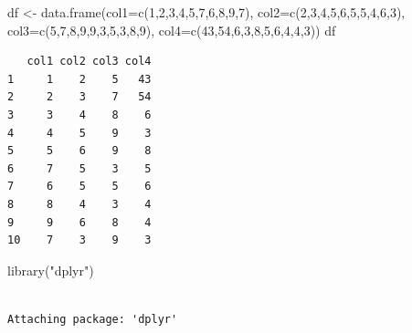 \documentclass[
  letterpaper,
  DIV=11,
  numbers=noendperiod]{scrreprt}
\newenvironment{Shaded}{\begin{snugshade}}{\end{snugshade}}
\newcommand{\AttributeTok}[1]{\textcolor[rgb]{0.40,0.45,0.13}{#1}}
\newcommand{\DecValTok}[1]{\textcolor[rgb]{0.68,0.00,0.00}{#1}}
\newcommand{\FunctionTok}[1]{\textcolor[rgb]{0.28,0.35,0.67}{#1}}
\newcommand{\NormalTok}[1]{\textcolor[rgb]{0.00,0.23,0.31}{#1}}
\newcommand{\OtherTok}[1]{\textcolor[rgb]{0.00,0.23,0.31}{#1}}
\newcommand{\StringTok}[1]{\textcolor[rgb]{0.13,0.47,0.30}{#1}}
\begin{document}
\begin{Shaded}
\begin{Highlighting}[]
\NormalTok{df }\OtherTok{\textless{}{-}} \FunctionTok{data.frame}\NormalTok{(}\AttributeTok{col1=}\FunctionTok{c}\NormalTok{(}\DecValTok{1}\NormalTok{,}\DecValTok{2}\NormalTok{,}\DecValTok{3}\NormalTok{,}\DecValTok{4}\NormalTok{,}\DecValTok{5}\NormalTok{,}\DecValTok{7}\NormalTok{,}\DecValTok{6}\NormalTok{,}\DecValTok{8}\NormalTok{,}\DecValTok{9}\NormalTok{,}\DecValTok{7}\NormalTok{),}
                 \AttributeTok{col2=}\FunctionTok{c}\NormalTok{(}\DecValTok{2}\NormalTok{,}\DecValTok{3}\NormalTok{,}\DecValTok{4}\NormalTok{,}\DecValTok{5}\NormalTok{,}\DecValTok{6}\NormalTok{,}\DecValTok{5}\NormalTok{,}\DecValTok{5}\NormalTok{,}\DecValTok{4}\NormalTok{,}\DecValTok{6}\NormalTok{,}\DecValTok{3}\NormalTok{),}
                 \AttributeTok{col3=}\FunctionTok{c}\NormalTok{(}\DecValTok{5}\NormalTok{,}\DecValTok{7}\NormalTok{,}\DecValTok{8}\NormalTok{,}\DecValTok{9}\NormalTok{,}\DecValTok{9}\NormalTok{,}\DecValTok{3}\NormalTok{,}\DecValTok{5}\NormalTok{,}\DecValTok{3}\NormalTok{,}\DecValTok{8}\NormalTok{,}\DecValTok{9}\NormalTok{),}
                 \AttributeTok{col4=}\FunctionTok{c}\NormalTok{(}\DecValTok{43}\NormalTok{,}\DecValTok{54}\NormalTok{,}\DecValTok{6}\NormalTok{,}\DecValTok{3}\NormalTok{,}\DecValTok{8}\NormalTok{,}\DecValTok{5}\NormalTok{,}\DecValTok{6}\NormalTok{,}\DecValTok{4}\NormalTok{,}\DecValTok{4}\NormalTok{,}\DecValTok{3}\NormalTok{))}
\NormalTok{df}
\end{Highlighting}
\end{Shaded}

\begin{verbatim}
   col1 col2 col3 col4
1     1    2    5   43
2     2    3    7   54
3     3    4    8    6
4     4    5    9    3
5     5    6    9    8
6     7    5    3    5
7     6    5    5    6
8     8    4    3    4
9     9    6    8    4
10    7    3    9    3
\end{verbatim}

\begin{Shaded}
\begin{Highlighting}[]
\FunctionTok{library}\NormalTok{(}\StringTok{"dplyr"}\NormalTok{)}
\end{Highlighting}
\end{Shaded}

\begin{verbatim}

Attaching package: 'dplyr'
\end{verbatim}
\end{document}
